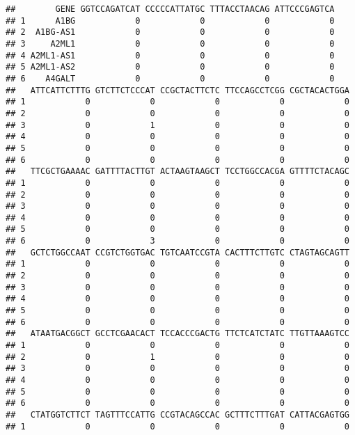 \documentclass[]{article}
\begin{document}
\begin{verbatim}
##        GENE GGTCCAGATCAT CCCCCATTATGC TTTACCTAACAG ATTCCCGAGTCA
## 1      A1BG            0            0            0            0
## 2  A1BG-AS1            0            0            0            0
## 3     A2ML1            0            0            0            0
## 4 A2ML1-AS1            0            0            0            0
## 5 A2ML1-AS2            0            0            0            0
## 6    A4GALT            0            0            0            0
##   ATTCATTCTTTG GTCTTCTCCCAT CCGCTACTTCTC TTCCAGCCTCGG CGCTACACTGGA
## 1            0            0            0            0            0
## 2            0            0            0            0            0
## 3            0            1            0            0            0
## 4            0            0            0            0            0
## 5            0            0            0            0            0
## 6            0            0            0            0            0
##   TTCGCTGAAAAC GATTTTACTTGT ACTAAGTAAGCT TCCTGGCCACGA GTTTTCTACAGC
## 1            0            0            0            0            0
## 2            0            0            0            0            0
## 3            0            0            0            0            0
## 4            0            0            0            0            0
## 5            0            0            0            0            0
## 6            0            3            0            0            0
##   GCTCTGGCCAAT CCGTCTGGTGAC TGTCAATCCGTA CACTTTCTTGTC CTAGTAGCAGTT
## 1            0            0            0            0            0
## 2            0            0            0            0            0
## 3            0            0            0            0            0
## 4            0            0            0            0            0
## 5            0            0            0            0            0
## 6            0            0            0            0            0
##   ATAATGACGGCT GCCTCGAACACT TCCACCCGACTG TTCTCATCTATC TTGTTAAAGTCC
## 1            0            0            0            0            0
## 2            0            1            0            0            0
## 3            0            0            0            0            0
## 4            0            0            0            0            0
## 5            0            0            0            0            0
## 6            0            0            0            0            0
##   CTATGGTCTTCT TAGTTTCCATTG CCGTACAGCCAC GCTTTCTTTGAT CATTACGAGTGG
## 1            0            0            0            0            0

\end{verbatim}
\end{document}
